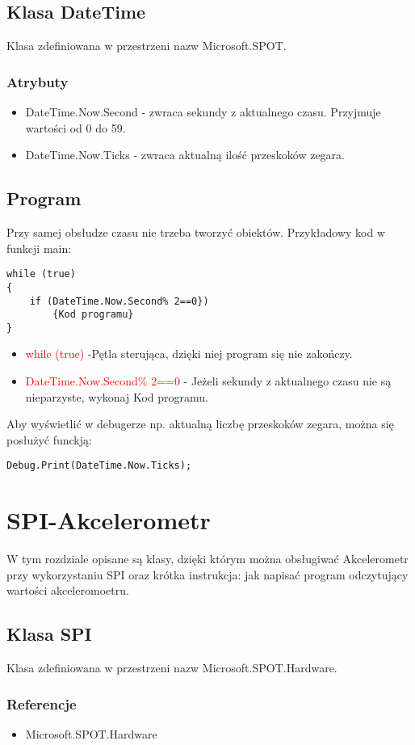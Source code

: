 \documentclass{article}
\begin{document}
\subsection{Klasa DateTime} 
Klasa zdefiniowana w przestrzeni nazw Microsoft.SPOT.
\subsubsection{Atrybuty}
\begin{itemize}
\item DateTime.Now.Second - zwraca sekundy z aktualnego czasu. Przyjmuje wartości od 0 do 59.
\item DateTime.Now.Ticks - zwraca aktualną ilość przeskoków zegara. 
\end{itemize}
\subsection{Program}
Przy samej obsłudze czasu nie trzeba tworzyć obiektów. Przykładowy kod w funkcji main:
\begin{lstlisting}[frame=single]
while (true)
{
	if (DateTime.Now.Second% 2==0})
		{Kod programu}
}
\end{lstlisting}
\begin{itemize}
\item \textcolor{red}{while (true)} -Pętla sterująca, dzięki niej program się nie zakończy.
\item \textcolor{red}{DateTime.Now.Second\% 2==0} - Jeżeli sekundy z aktualnego czasu nie są nieparzyste, wykonaj Kod programu.
\end{itemize}
Aby wyświetlić w debugerze np. aktualną liczbę przeskoków zegara, można się posłużyć funckją:
\begin{lstlisting}[frame=single]
Debug.Print(DateTime.Now.Ticks);
\end{lstlisting}
\section{SPI-Akcelerometr}
W tym rozdziale opisane są klasy, dzięki którym można obsługiwać Akcelerometr przy wykorzystaniu SPI oraz krótka instrukcja: jak napisać program odczytujący wartości akceleromoetru.
\subsection{Klasa SPI}
Klasa zdefiniowana w przestrzeni nazw Microsoft.SPOT.Hardware. 
\subsubsection{Referencje}
\begin{itemize}
\item Microsoft.SPOT.Hardware
\end{itemize}
\end{document}

